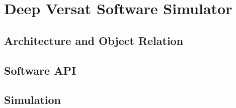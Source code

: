 \chapter{Deep Versat Software Simulator}
\label{chapter:Simulator}



\section{Architecture and Object Relation}



\section{Software API}


\section{Simulation}


